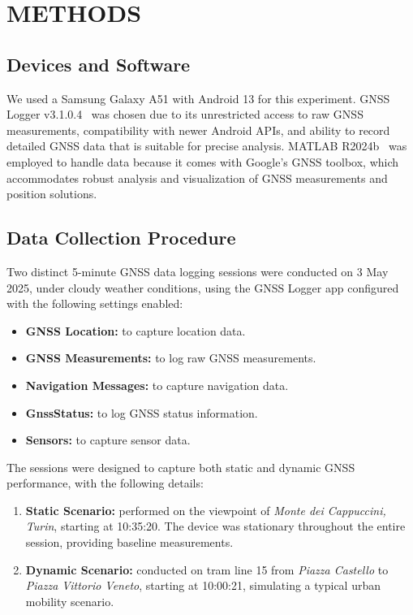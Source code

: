 
\section{METHODS} \label{sec:methods}

    \subsection{Devices and Software}
    
        We used a Samsung Galaxy A51 with Android 13 for this experiment.
        GNSS Logger v3.1.0.4~\cite{GNSSLogger2025} was chosen due to its unrestricted access to raw GNSS measurements, compatibility with newer Android APIs, and ability to record detailed GNSS data that is suitable for precise analysis.
        MATLAB R2024b~\cite{MATLAB2024b} was employed to handle data because it comes with Google's GNSS toolbox, which accommodates robust analysis and visualization of GNSS measurements and position solutions.
        
    \subsection{Data Collection Procedure}
    
        Two distinct 5-minute GNSS data logging sessions were conducted on 3 May 2025, under cloudy weather conditions, using the GNSS Logger app configured with the following settings enabled:

        \begin{itemize}
            \item \textbf{GNSS Location:} to capture location data.
            \item \textbf{GNSS Measurements:} to log raw GNSS measurements.
            \item \textbf{Navigation Messages:} to capture navigation data.
            \item \textbf{GnssStatus:} to log GNSS status information.
            \item \textbf{Sensors:} to capture sensor data.
        \end{itemize}
        
        \noindent The sessions were designed to capture both static and dynamic GNSS performance, with the following details:

        \begin{enumerate}[label=\alph*)]
            \item \textbf{Static Scenario:} performed on the viewpoint of \textit{Monte dei Cappuccini, Turin}, starting at 10:35:20. The device was stationary throughout the entire session, providing baseline measurements.
            \item \textbf{Dynamic Scenario:} conducted on tram line 15 from \textit{Piazza Castello} to \textit{Piazza Vittorio Veneto}, starting at 10:00:21, simulating a typical urban mobility scenario.
        \end{enumerate}

